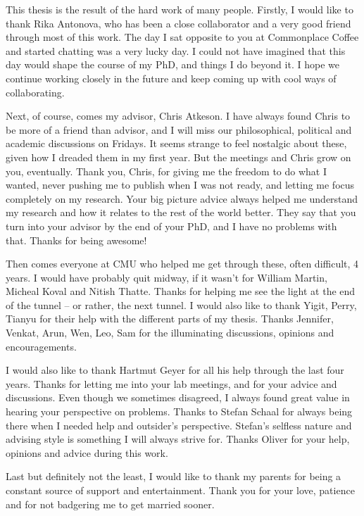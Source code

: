 
\begin{acknowledgements}
\addchaptertocentry{\acknowledgementname} %

This thesis is the result of the hard work of many people. Firstly, I would like to thank Rika Antonova, who has been a close collaborator and a very good friend through most of this work. The day I sat opposite to you at Commonplace Coffee and started chatting was a very lucky day. I could not have imagined that this day would shape the course of my PhD, and things I do beyond it. I hope we continue working closely in the future and keep coming up with cool ways of collaborating. 

Next, of course, comes my advisor, Chris Atkeson. I have always found Chris to be more of a friend than advisor, and I will miss our philosophical, political and academic discussions on Fridays. It seems strange to feel nostalgic about these, given how I dreaded them in my first year. But the meetings and Chris grow on you, eventually. Thank you, Chris, for giving me the freedom to do what I wanted, never pushing me to publish when I was not ready, and letting me focus completely on my research. Your big picture advice always helped me understand my research and how it relates to the rest of the world better. They say that you turn into your advisor by the end of your PhD, and I have no problems with that. Thanks for being awesome!

Then comes everyone at CMU who helped me get through these, often difficult, 4 years. I would have probably quit midway, if it wasn't for William Martin, Micheal Koval and Nitish Thatte. Thanks for helping me see the light at the end of the tunnel -- or rather, the next tunnel. I would also like to thank Yigit, Perry, Tianyu for their help with the different parts of my thesis. Thanks Jennifer, Venkat, Arun, Wen, Leo, Sam for the illuminating discussions, opinions and encouragements. 

I would also like to thank Hartmut Geyer for all his help through the last four years. Thanks for letting me into your lab meetings, and for your advice and discussions. Even though we sometimes disagreed, I always found great value in hearing your perspective on problems. Thanks to Stefan Schaal for always being there when I needed help and outsider's perspective. Stefan's selfless nature and advising style is something I will always strive for. Thanks Oliver for your help, opinions and advice during this work. 

Last but definitely not the least, I would like to thank my parents for being a constant source of support and entertainment. Thank you for your love, patience and for not badgering me to get married sooner.

\end{acknowledgements}